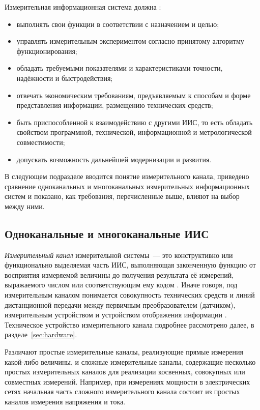 \documentclass[a4paper, 14pt, titlepage]{extarticle}
\newcommand{\term}[1]{\emph{#1}}
\begin{document}
  Измерительная информационная система должна \cite[с.~28]{rannev-iis}:
  \begin{itemize}
    \item выполнять свои функции в соответствии с назначением и целью;
    \item управлять измерительным экспериментом согласно принятому алгоритму функционирования;
    \item обладать требуемыми показателями и характеристиками точности, надёжности и быстродействия;
    \item отвечать экономическим требованиям, предъявляемым к способам и форме представления
      информации, размещению технических средств; %
    \item быть приспособленной к взаимодействию с другими ИИС, то есть обладать свойством программной, технической, информационной и метрологической
      совместимости;
    \item допускать возможность дальнейшей модернизации и развития.
  \end{itemize}

  В следующем подразделе вводится понятие измерительного канала, приведено сравнение одноканальных
  и многоканальных измерительных информационных систем и показано, как требования, перечисленные
  выше, влияют на выбор между ними.

  \subsection{Одноканальные и многоканальные ИИС}\label{ssec:multichannel}

  \term{Измерительный канал} измерительной системы~--- это конструктивно или функционально
  выделяемая часть ИИС, выполняющая законченную функцию от восприятия измеряемой величины до
  получения результата её измерений, выражаемого числом или соответствующим ему кодом
  \cite[с.~9]{volkov-iis}. Иначе говоря, под измерительным каналом понимается совокупность
  технических средств и линий дистанционной передачи между первичным преобразователем (датчиком), измерительным
  устройством и устройством отображения информации \cite[с.~420]{rannev-meas-tech}. Техническое
  устройство измерительного канала подробнее рассмотрено далее, в разделе~\ref{sec:hardware}.

  Различают простые измерительные каналы, реализующие прямые измерения какой-либо величины, и
  сложные измерительные каналы, содержащие несколько простых измерительных каналов для реализации
  косвенных, совокупных или совместных измерений. Например, при измерениях мощности в электрических
  сетях начальная часть сложного измерительного канала состоит из простых каналов измерения
  напряжения и тока.
\end{document}
